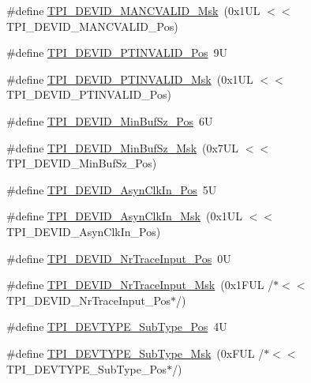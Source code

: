 \begin{DoxyCompactItemize}
\item 
\#define \mbox{\hyperlink{group___c_m_s_i_s___t_p_i_ga4c3ee4b1a34ad1960a6b2d6e7e0ff942}{T\+P\+I\+\_\+\+D\+E\+V\+I\+D\+\_\+\+M\+A\+N\+C\+V\+A\+L\+I\+D\+\_\+\+Msk}}~(0x1\+U\+L $<$$<$ T\+P\+I\+\_\+\+D\+E\+V\+I\+D\+\_\+\+M\+A\+N\+C\+V\+A\+L\+I\+D\+\_\+\+Pos)
\item 
\#define \mbox{\hyperlink{group___c_m_s_i_s___t_p_i_ga974cccf4c958b4a45cb71c7b5de39b7b}{T\+P\+I\+\_\+\+D\+E\+V\+I\+D\+\_\+\+P\+T\+I\+N\+V\+A\+L\+I\+D\+\_\+\+Pos}}~9U
\item 
\#define \mbox{\hyperlink{group___c_m_s_i_s___t_p_i_ga1ca84d62243e475836bba02516ba6b97}{T\+P\+I\+\_\+\+D\+E\+V\+I\+D\+\_\+\+P\+T\+I\+N\+V\+A\+L\+I\+D\+\_\+\+Msk}}~(0x1\+U\+L $<$$<$ T\+P\+I\+\_\+\+D\+E\+V\+I\+D\+\_\+\+P\+T\+I\+N\+V\+A\+L\+I\+D\+\_\+\+Pos)
\item 
\#define \mbox{\hyperlink{group___c_m_s_i_s___t_p_i_ga3f7da5de2a34be41a092e5eddd22ac4d}{T\+P\+I\+\_\+\+D\+E\+V\+I\+D\+\_\+\+Min\+Buf\+Sz\+\_\+\+Pos}}~6U
\item 
\#define \mbox{\hyperlink{group___c_m_s_i_s___t_p_i_ga939e068ff3f1a65b35187ab34a342cd8}{T\+P\+I\+\_\+\+D\+E\+V\+I\+D\+\_\+\+Min\+Buf\+Sz\+\_\+\+Msk}}~(0x7\+U\+L $<$$<$ T\+P\+I\+\_\+\+D\+E\+V\+I\+D\+\_\+\+Min\+Buf\+Sz\+\_\+\+Pos)
\item 
\#define \mbox{\hyperlink{group___c_m_s_i_s___t_p_i_gab382b1296b5efd057be606eb8f768df8}{T\+P\+I\+\_\+\+D\+E\+V\+I\+D\+\_\+\+Asyn\+Clk\+In\+\_\+\+Pos}}~5U
\item 
\#define \mbox{\hyperlink{group___c_m_s_i_s___t_p_i_gab67830557d2d10be882284275025a2d3}{T\+P\+I\+\_\+\+D\+E\+V\+I\+D\+\_\+\+Asyn\+Clk\+In\+\_\+\+Msk}}~(0x1\+U\+L $<$$<$ T\+P\+I\+\_\+\+D\+E\+V\+I\+D\+\_\+\+Asyn\+Clk\+In\+\_\+\+Pos)
\item 
\#define \mbox{\hyperlink{group___c_m_s_i_s___t_p_i_ga80ecae7fec479e80e583f545996868ed}{T\+P\+I\+\_\+\+D\+E\+V\+I\+D\+\_\+\+Nr\+Trace\+Input\+\_\+\+Pos}}~0U
\item 
\#define \mbox{\hyperlink{group___c_m_s_i_s___t_p_i_gabed454418d2140043cd65ec899abd97f}{T\+P\+I\+\_\+\+D\+E\+V\+I\+D\+\_\+\+Nr\+Trace\+Input\+\_\+\+Msk}}~(0x1\+F\+U\+L /$\ast$$<$$<$ T\+P\+I\+\_\+\+D\+E\+V\+I\+D\+\_\+\+Nr\+Trace\+Input\+\_\+\+Pos$\ast$/)
\item 
\#define \mbox{\hyperlink{group___c_m_s_i_s___t_p_i_ga0c799ff892af5eb3162d152abc00af7a}{T\+P\+I\+\_\+\+D\+E\+V\+T\+Y\+P\+E\+\_\+\+Sub\+Type\+\_\+\+Pos}}~4U
\item 
\#define \mbox{\hyperlink{group___c_m_s_i_s___t_p_i_ga5b2fd7dddaf5f64855d9c0696acd65c1}{T\+P\+I\+\_\+\+D\+E\+V\+T\+Y\+P\+E\+\_\+\+Sub\+Type\+\_\+\+Msk}}~(0x\+F\+U\+L /$\ast$$<$$<$ T\+P\+I\+\_\+\+D\+E\+V\+T\+Y\+P\+E\+\_\+\+Sub\+Type\+\_\+\+Pos$\ast$/)

\end{DoxyCompactItemize}
